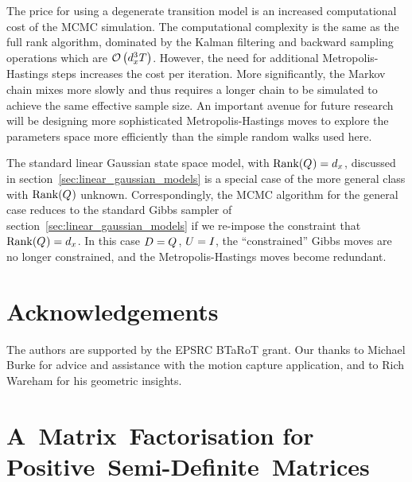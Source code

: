 \documentclass[journal,10pt]{IEEEtran}
\begin{document}
The price for using a degenerate transition model is an increased computational cost of the MCMC simulation. The computational complexity is the same as the full rank algorithm, dominated by the Kalman filtering and backward sampling operations which are $\mathcal{O}\left(d_x^3 T\right)$. However, the need for additional Metropolis-Hastings steps increases the cost per iteration. More significantly, the Markov chain mixes more slowly and thus requires a longer chain to be simulated to achieve the same effective sample size. An important avenue for future research will be designing more sophisticated Metropolis-Hastings moves to explore the parameters space more efficiently than the simple random walks used here.

The standard linear Gaussian state space model, with $\operatorname{Rank}(Q_{})=d_x$, discussed in section~\ref{sec:linear_gaussian_models} is a special case of the more general class with $\operatorname{Rank}(Q_{})$ unknown. Correspondingly, the MCMC algorithm for the general case reduces to the standard Gibbs sampler of section~\ref{sec:linear_gaussian_models} if we re-impose the constraint that $\operatorname{Rank}(Q_{})=d_x$. In this case $D=Q_{}$, $U=I_{}$, the ``constrained'' Gibbs moves are no longer constrained, and the Metropolis-Hastings moves become redundant.



\section*{Acknowledgements}
The authors are supported by the EPSRC BTaRoT grant. Our thanks to Michael Burke for advice and assistance with the motion capture application, and to Rich Wareham for his geometric insights.


\appendices

\section{A~Matrix~Factorisation for Positive~Semi-Definite~Matrices} \label{app:givens-factorisation}
\end{document}
